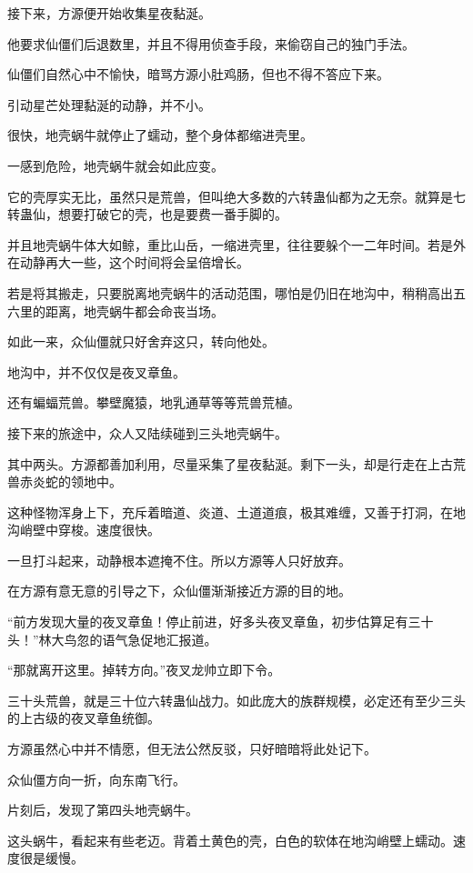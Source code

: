 \begin{this_body}
接下来，方源便开始收集星夜黏涎。

他要求仙僵们后退数里，并且不得用侦查手段，来偷窃自己的独门手法。

仙僵们自然心中不愉快，暗骂方源小肚鸡肠，但也不得不答应下来。

引动星芒处理黏涎的动静，并不小。

很快，地壳蜗牛就停止了蠕动，整个身体都缩进壳里。

一感到危险，地壳蜗牛就会如此应变。

它的壳厚实无比，虽然只是荒兽，但叫绝大多数的六转蛊仙都为之无奈。就算是七转蛊仙，想要打破它的壳，也是要费一番手脚的。

并且地壳蜗牛体大如鲸，重比山岳，一缩进壳里，往往要躲个一二年时间。若是外在动静再大一些，这个时间将会呈倍增长。

若是将其搬走，只要脱离地壳蜗牛的活动范围，哪怕是仍旧在地沟中，稍稍高出五六里的距离，地壳蜗牛都会命丧当场。

如此一来，众仙僵就只好舍弃这只，转向他处。

地沟中，并不仅仅是夜叉章鱼。

还有蝙蝠荒兽。攀壁魔猿，地乳通草等等荒兽荒植。

接下来的旅途中，众人又陆续碰到三头地壳蜗牛。

其中两头。方源都善加利用，尽量采集了星夜黏涎。剩下一头，却是行走在上古荒兽赤炎蛇的领地中。

这种怪物浑身上下，充斥着暗道、炎道、土道道痕，极其难缠，又善于打洞，在地沟峭壁中穿梭。速度很快。

一旦打斗起来，动静根本遮掩不住。所以方源等人只好放弃。

在方源有意无意的引导之下，众仙僵渐渐接近方源的目的地。

“前方发现大量的夜叉章鱼！停止前进，好多头夜叉章鱼，初步估算足有三十头！”林大鸟忽的语气急促地汇报道。

“那就离开这里。掉转方向。”夜叉龙帅立即下令。

三十头荒兽，就是三十位六转蛊仙战力。如此庞大的族群规模，必定还有至少三头的上古级的夜叉章鱼统御。

方源虽然心中并不情愿，但无法公然反驳，只好暗暗将此处记下。

众仙僵方向一折，向东南飞行。

片刻后，发现了第四头地壳蜗牛。

这头蜗牛，看起来有些老迈。背着土黄色的壳，白色的软体在地沟峭壁上蠕动。速度很是缓慢。


\end{this_body}
